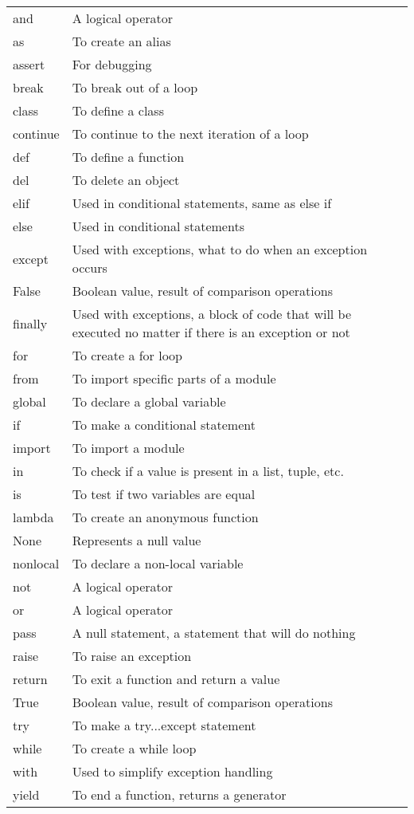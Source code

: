 \begin{xtabular}{K p{.80\textwidth}} 
    and & A logical operator\\
    as & To create an alias\\
    assert & For debugging\\
    break & To break out of a loop\\
    class & To define a class\\
    continue & To continue to the next iteration of a loop\\
    def & To define a function\\
    del & To delete an object\\
    elif & Used in conditional statements, same as else if\\
    else & Used in conditional statements\\
    except & Used with exceptions, what to do when an exception occurs\\
    False & Boolean value, result of comparison operations\\
    finally & Used with exceptions, a block of code that will be executed no matter if there is an exception or not\\
    for & To create a for loop\\
    from & To import specific parts of a module\\
    global & To declare a global variable\\
    if & To make a conditional statement\\
    import & To import a module\\
    in & To check if a value is present in a list, tuple, etc.\\
    is & To test if two variables are equal\\
    lambda & To create an anonymous function\\
    None & Represents a null value\\
    nonlocal & To declare a non-local variable\\
    not & A logical operator\\
    or & A logical operator\\
    pass & A null statement, a statement that will do nothing\\
    raise & To raise an exception\\
    return & To exit a function and return a value\\
    True & Boolean value, result of comparison operations\\
    try & To make a try...except statement\\
    while & To create a while loop\\
    with & Used to simplify exception handling\\
    yield & To end a function, returns a generator\\
\end{xtabular}
